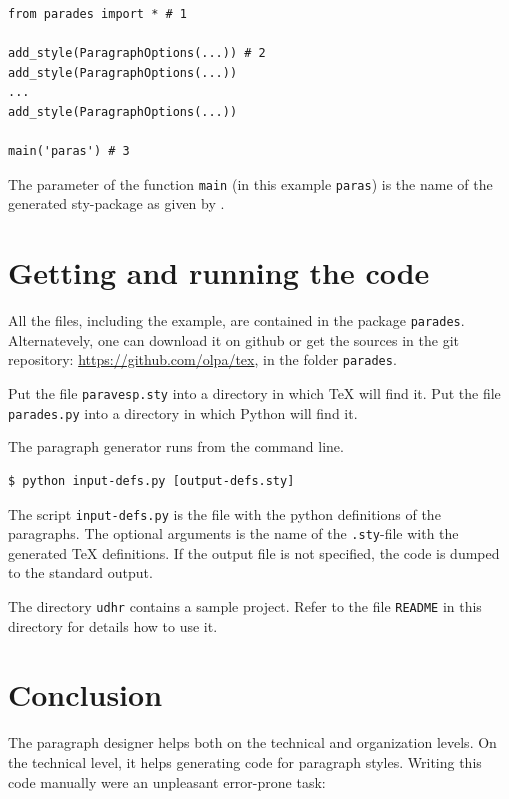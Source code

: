 \documentclass[]{ltugboat}
\begin{document}
\begin{verbatim}
from parades import * # 1

add_style(ParagraphOptions(...)) # 2
add_style(ParagraphOptions(...))
...
add_style(ParagraphOptions(...))

main('paras') # 3
\end{verbatim}

The parameter of the function \verb|main| (in this example \verb|paras|) is the name of the generated sty-package as given by .


\section{Getting and running the code}

All the files, including the example, are contained in the  package \verb|parades|. Alternatevely, one can download it on github or get the sources in the git repository: \url{https://github.com/olpa/tex}, in the folder \verb|parades|.

Put the file \verb|paravesp.sty| into a directory in which \TeX{} will find it. Put the file \verb|parades.py| into a directory in which Python will find it.

The paragraph generator runs from the command line.

\begin{verbatim}
$ python input-defs.py [output-defs.sty]
\end{verbatim}

The script \verb|input-defs.py| is the file with the python definitions of the paragraphs. The optional arguments is the name of the \verb|.sty|-file with the generated \TeX{} definitions. If the output file is not specified, the code is dumped to the standard output.

The directory \verb|udhr| contains a sample project. Refer to the file \verb|README| in this directory for details how to use it.

\section{Conclusion}

The paragraph designer helps both on the technical and organization levels.
On the technical level, it helps generating code for paragraph styles. Writing this code manually were an unpleasant error-prone task:
\end{document}
